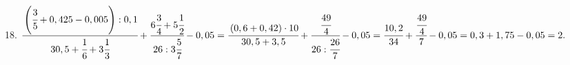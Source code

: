 18. $\cfrac{\left(\cfrac{3}{5}+0,425-0,005\right):0,1}{30,5+\cfrac{1}{6}+3\cfrac{1}{3}}+
\cfrac{6\cfrac{3}{4}+5\cfrac{1}{2}}{26:3\cfrac{5}{7}}-0,05=\cfrac{\left(0,6+0,42\right)\cdot10}{30,5+3,5}+
\cfrac{\cfrac{49}{4}}{26:\cfrac{26}{7}}-0,05=\cfrac{10,2}{34}+\cfrac{\cfrac{49}{4}}{7}-0,05=
0,3+1,75-0,05=2.$\\
